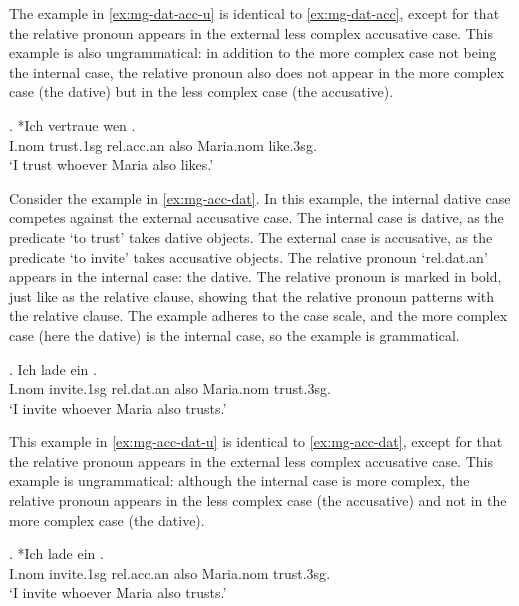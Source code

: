 The example in \ref{ex:mg-dat-acc-u} is identical to \ref{ex:mg-dat-acc}, except for that the relative pronoun appears in the external less complex accusative case. This example is also ungrammatical: in addition to the more complex case not being the internal case, the relative pronoun also does not appear in the more complex case (the dative) but in the less complex case (the accusative).

\exg. *Ich vertraue wen   . \\
I.\ac{nom} trust.1\ac{sg}\scsub{[dat]} \ac{rel}.\ac{acc}.\ac{an} also Maria.\ac{nom} like.3\ac{sg}\scsub{[acc]}.\\
`I trust whoever Maria also likes.' \label{ex:mg-dat-acc-u}

Consider the example in \ref{ex:mg-acc-dat}. In this example, the internal dative case competes against the external accusative case.
The internal case is dative, as the predicate  `to trust' takes dative objects.
The external case is accusative, as the predicate  `to invite' takes accusative objects.
The relative pronoun  `\ac{rel}.\ac{dat}.\ac{an}' appears in the internal case: the dative. The relative pronoun is marked in bold, just like as the relative clause, showing that the relative pronoun patterns with the relative clause.
The example adheres to the case scale, and the more complex case (here the dative) is the internal case, so the example is grammatical.

\exg. Ich {lade ein}    . \\
I.\ac{nom} invite.1\ac{sg}\scsub{[acc]} \ac{rel}.\ac{dat}.\ac{an} also Maria.\ac{nom} trust.3\ac{sg}\scsub{[dat]}.\\
`I invite whoever Maria also trusts.' \label{ex:mg-acc-dat}

This example in \ref{ex:mg-acc-dat-u} is identical to \ref{ex:mg-acc-dat}, except for that the relative pronoun appears in the external less complex accusative case. This example is ungrammatical: although the internal case is more complex, the relative pronoun appears in the less complex case (the accusative) and not in the more complex case (the dative).

\exg. *Ich {lade ein}    . \\
I.\ac{nom} invite.1\ac{sg}\scsub{[acc]} \ac{rel}.\ac{acc}.\ac{an} also Maria.\ac{nom} trust.3\ac{sg}\scsub{[dat]}.\\
`I invite whoever Maria also trusts.' \label{ex:mg-acc-dat-u}

